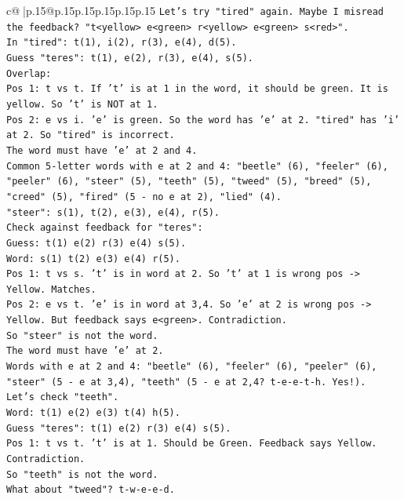 \documentclass{article}
\begin{document}
{\begin{supertabular}{c@{$\;$}|p{.15\linewidth}@{}p{.15\linewidth}p{.15\linewidth}p{.15\linewidth}p{.15\linewidth}p{.15\linewidth}}
{{{\texttt{Let's try "tired" again. Maybe I misread the feedback? "t<yellow> e<green> r<yellow> e<green> s<red>".} \\
\texttt{In "tired": t(1), i(2), r(3), e(4), d(5).} \\
\texttt{Guess "teres": t(1), e(2), r(3), e(4), s(5).} \\
\texttt{Overlap:} \\
\texttt{Pos 1: t vs t. If 't' is at 1 in the word, it should be green. It is yellow. So 't' is NOT at 1.} \\
\texttt{Pos 2: e vs i. 'e' is green. So the word has 'e' at 2. "tired" has 'i' at 2. So "tired" is incorrect.} \\
\texttt{The word must have 'e' at 2 and 4.} \\
\texttt{Common 5{-}letter words with e at 2 and 4: "beetle" (6), "feeler" (6), "peeler" (6), "steer" (5), "teeth" (5), "tweed" (5), "breed" (5), "creed" (5), "fired" (5 {-} no e at 2), "lied" (4).} \\
\texttt{"steer": s(1), t(2), e(3), e(4), r(5).} \\
\texttt{Check against feedback for "teres":} \\
\texttt{Guess: t(1) e(2) r(3) e(4) s(5).} \\
\texttt{Word: s(1) t(2) e(3) e(4) r(5).} \\
\texttt{Pos 1: t vs s. 't' is in word at 2. So 't' at 1 is wrong pos {-}> Yellow. Matches.} \\
\texttt{Pos 2: e vs t. 'e' is in word at 3,4. So 'e' at 2 is wrong pos {-}> Yellow. But feedback says e<green>. Contradiction.} \\
\texttt{So "steer" is not the word.} \\
\texttt{The word must have 'e' at 2.} \\
\texttt{Words with e at 2 and 4: "beetle" (6), "feeler" (6), "peeler" (6), "steer" (5 {-} e at 3,4), "teeth" (5 {-} e at 2,4? t{-}e{-}e{-}t{-}h. Yes!).} \\
\texttt{Let's check "teeth".} \\
\texttt{Word: t(1) e(2) e(3) t(4) h(5).} \\
\texttt{Guess "teres": t(1) e(2) r(3) e(4) s(5).} \\
\texttt{Pos 1: t vs t. 't' is at 1. Should be Green. Feedback says Yellow. Contradiction.} \\
\texttt{So "teeth" is not the word.} \\
\texttt{What about "tweed"? t{-}w{-}e{-}e{-}d.} \\
}}}
\end{supertabular}}
\end{document}

